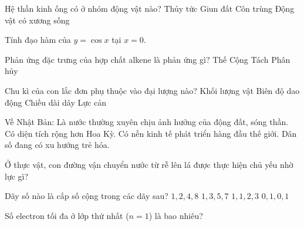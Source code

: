 \begin{ex}
    Hệ thần kinh ống có ở nhóm động vật nào?
    \choice
    {Thủy tức}
    {Giun đất}
    {Côn trùng}
    {\True Động vật có xương sống}
\end{ex}

\begin{ex}
    Tính đạo hàm của $y = \cos x$ tại $x=0$.
\end{ex}

\begin{ex}
    Phản ứng đặc trưng của hợp chất alkene là phản ứng gì?
    \choice
    {Thế}
    {\True Cộng}
    {Tách}
    {Phân hủy}
\end{ex}

\begin{ex}
    Chu kì của con lắc đơn phụ thuộc vào đại lượng nào?
    \choice
    {Khối lượng vật}
    {Biên độ dao động}
    {\True Chiều dài dây}
    {Lực cản}
\end{ex}

\begin{ex}
    Về Nhật Bản:
    \choiceTF
    {\True Là nước thường xuyên chịu ảnh hưởng của động đất, sóng thần.}
    {Có diện tích rộng hơn Hoa Kỳ.}
    {\True Có nền kinh tế phát triển hàng đầu thế giới.}
    {Dân số đang có xu hướng trẻ hóa.}
\end{ex}

\begin{ex}
    Ở thực vật, con đường vận chuyển nước từ rễ lên lá được thực hiện chủ yếu nhờ lực gì?

\end{ex}

\begin{ex}
    Dãy số nào là cấp số cộng trong các dãy sau?
    \choice
    {$1, 2, 4, 8$}
    {\True $1, 3, 5, 7$}
    {$1, 1, 2, 3$}
    {$0, 1, 0, 1$}
\end{ex}

\begin{ex}
    Số electron tối đa ở lớp thứ nhất ($n=1$) là bao nhiêu?
\end{ex}


